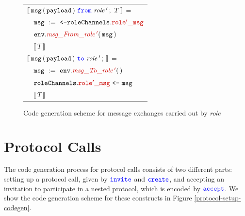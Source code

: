 \documentclass[12pt,twoside]{report}
\begin{document}
\begin{figure}[!h]
    \begin{center}
        \begin{tabular}{l}
            $\llbracket\,\varname{msg}\,(\,\varname{payload}\,)\ \from\ \mathit{role\,'}\,;\ T\,\rrbracket$ =\\[10pt]
            
            $\quad \assignment{msg}{\texttt{<-}\structaccess{\rolechannels}{role'\_msg}}$\\[3pt]
            $\quad \methodcall{\envparam}{\functionname{msg\_From\_role\,'}}\params{\varname{msg}}$\\[3pt]
            
            $\quad \llbracket\,T\,\rrbracket$\\[30pt]
            
            $\llbracket\,\varname{msg}\,(\,\varname{payload}\,)\ \scrto\ \mathit{role\,'}\,;\,\rrbracket$ =\\[10pt]
            
            $\quad \assignment{msg}{\methodcall{\envparam}{msg\_To\_role\,'}\emptyparams}$\\[3pt]
            $\quad \chansend{\structaccess{\rolechannels}{role'\_msg}}{\varname{msg}}$\\[3pt]

            $\quad \llbracket\,T\,\rrbracket$
            

        \end{tabular}
    \end{center}
    \caption{Code generation scheme for message exchanges carried out by \textit{role}}
    \label{message-exchange-codegen}
\end{figure}

\section{Protocol Calls}\label{protocol-calls-impl}
The code generation process for protocol calls consists of two different parts: setting up a protocol call, given by ${\color{blue}\mathtt{invite}}$ and ${\color{blue}\mathtt{create}}$, and accepting an invitation to participate in a nested protocol, which is encoded by ${\color{blue}\mathtt{accept}}$. We show the code generation scheme for these constructs in Figure \ref{protocol-setup-codegen}.\\
\end{document}
